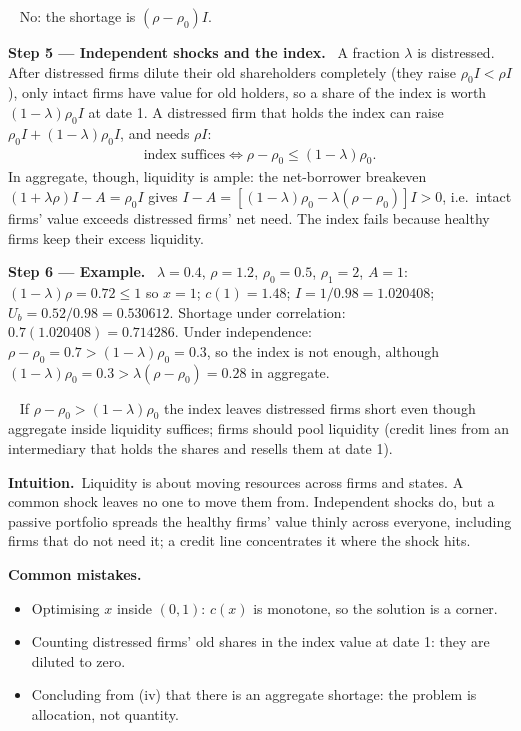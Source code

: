 \documentclass[11pt,a4paper]{article}
\newcommand{\step}[2]{\par\medskip\noindent\textbf{Step #1 --- #2.}~}
\newcommand{\intuition}{\par\medskip\noindent\textbf{Intuition.}~}
\newcommand{\answer}[1]{\par\smallskip\noindent\fbox{\textbf{Answer\if\relax\detokenize{#1}\relax\else\ #1\fi.}}~}
\newcommand{\pitfalls}{\par\medskip\noindent\textbf{Common mistakes.}}
\begin{document}
\answer{(iii)} No: the shortage is $(\rho-\rho_0)I$.

\step{5}{Independent shocks and the index} A fraction $\lambda$ is distressed. After distressed firms dilute their old shareholders completely (they raise $\rho_0I<\rho I$), only intact firms have value for old holders, so a share of the index is worth $(1-\lambda)\rho_0I$ at date 1. A distressed firm that holds the index can raise $\rho_0I+(1-\lambda)\rho_0I$, and needs $\rho I$:
\begin{align}
  \text{index suffices} \iff \rho-\rho_0\leq(1-\lambda)\rho_0. \label{r10e8-index}
\end{align}
In aggregate, though, liquidity is ample: the net-borrower breakeven $(1+\lambda\rho)I-A=\rho_0I$ gives $I-A=[(1-\lambda)\rho_0-\lambda(\rho-\rho_0)]I>0$, i.e.\ intact firms' value exceeds distressed firms' net need. The index fails because healthy firms keep their excess liquidity.

\step{6}{Example} $\lambda=0.4$, $\rho=1.2$, $\rho_0=0.5$, $\rho_1=2$, $A=1$: $(1-\lambda)\rho=0.72\leq1$ so $x=1$; $c(1)=1.48$; $I=1/0.98=1.020408$; $U_b=0.52/0.98=0.530612$. Shortage under correlation: $0.7(1.020408)=0.714286$. Under independence: $\rho-\rho_0=0.7>(1-\lambda)\rho_0=0.3$, so the index is not enough, although $(1-\lambda)\rho_0=0.3>\lambda(\rho-\rho_0)=0.28$ in aggregate.

\answer{(iv)} If $\rho-\rho_0>(1-\lambda)\rho_0$ the index leaves distressed firms short even though aggregate inside liquidity suffices; firms should pool liquidity (credit lines from an intermediary that holds the shares and resells them at date 1).

\intuition Liquidity is about moving resources across firms and states. A common shock leaves no one to move them from. Independent shocks do, but a passive portfolio spreads the healthy firms' value thinly across everyone, including firms that do not need it; a credit line concentrates it where the shock hits.

\pitfalls
\begin{itemize}
  \item Optimising $x$ inside $(0,1)$: $c(x)$ is monotone, so the solution is a corner.
  \item Counting distressed firms' old shares in the index value at date 1: they are diluted to zero.
  \item Concluding from (iv) that there is an aggregate shortage: the problem is allocation, not quantity.
\end{itemize}
\end{document}
